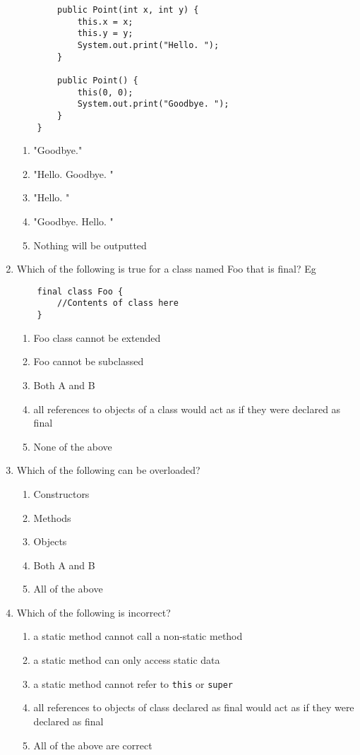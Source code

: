 \documentclass[S17-Final.tex]{subfiles}
\begin{document}
\begin{enumerate}
\begin{lstlisting}
		public Point(int x, int y) {
			this.x = x;
			this.y = y;
			System.out.print("Hello. ");
		}
		
		public Point() {
			this(0, 0);
			System.out.print("Goodbye. ");
		}
	}

\end{lstlisting}
	
\begin{enumerate}
\item  "Goodbye."
\item  "Hello. Goodbye. "
\item  "Hello. "
\item  "Goodbye. Hello. "
\item  Nothing will be outputted
\end{enumerate}

\item Which of the following is true for a class named Foo that is final? Eg
\begin{lstlisting}
    final class Foo {
		//Contents of class here
    }
\end{lstlisting}
	
\begin{enumerate}
\item  Foo class cannot be extended
\item  Foo cannot be subclassed
\item  Both A and B
\item  all references to objects of a class would act as if they were declared as final
\item  None of the above
\end{enumerate}


\item Which of the following can be overloaded?
	
\begin{enumerate}
\item  Constructors
\item  Methods
\item  Objects
\item  Both A and B
\item  All of the above
\end{enumerate}

\item Which of the following is incorrect?

\begin{enumerate}
\item  a static method cannot call a non-static method
\item  a static method can only access static data
\item  a static method cannot refer to \texttt{this} or \texttt{super}
\item  all references to objects of class declared as final would act as if they were declared as final
\item  All of the above are correct
\end{enumerate}


\end{enumerate}
\end{document}
